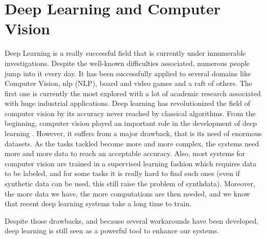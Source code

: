 \documentclass[12pt, a4paper]{report}
\begin{document}
		\section{Deep Learning and Computer Vision}
			Deep Learning is a really successful field that is currently under innumerable investigations.
			Despite the well-known difficulties associated, numerous people jump into it every day.
			It has been successfully applied to several domains like Computer Vision, \gls{nlp} (NLP), board and video games and a raft of others.
			The first one is currently the most explored with a lot of academic research associated with huge industrial applications.
			Deep learning has revolutionized the field of computer vision by its accuracy never reached by classical algorithms.
			From the beginning, computer vision played an important role in the development of deep learning \cite{lecun1989backpropagation,lecun1998gradient,fukushima1981neocognitron}.
			However, it suffers from a major drawback, that is its need of enormous datasets.
			As the tasks tackled become more and more complex, the systems need more and more data to reach an acceptable accuracy.
			Also, most systems for computer vision are trained in a supervised learning fashion which requires data to be labeled, and for some tasks it is really hard to find such ones (even if synthetic data can be used, this still raise the problem of \gls{synthdata}).
			Moreover, the more data we have, the more computations are then needed, and we know that recent deep learning systems take a long time to train.
			\par
			Despite those drawbacks, and because several workarounds have been developed, deep learning is still seen as a powerful tool to enhance our systems.
\end{document}
